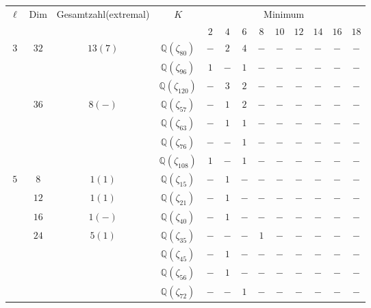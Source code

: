 \documentclass[12pt,a4paper,halfparskip,headsepline,bibtotocnumbered]{scrreprt}
\theoremstyle{nummermitklammern}
\theoremstyle{nonumberbreak}
\newcommand{\Q}{\mathbb{Q}}
\begin{document}
\begin{table}
	\centering
	\begin{tabular}{|c|c|c|c|c|c|c|c|c|c|c|c|c|}
		\hline		
		\multirow{2}{*}{$\ell$}	&\multirow{2}{*}{Dim}	&\multirow{2}{*}{Gesamtzahl(extremal)}	&\multirow{2}{*}{$K$}	&\multicolumn{9}{c|}{Minimum}\\ \cline{5-13}
								&						&							&					&$2$	&$4$	&$6$	&$8$	&$10$	&$12$	&$14$	&$16$	&$18$\\ \hline
		\multirow{7}{*}{$3$}	&\multirow{3}{*}{$32$}	&\multirow{3}{*}{$13(7)$}	&$\Q(\zeta_{80})$	&$-$	&$2$	&$4$	&$-$	&$-$	&$-$	&$-$	&$-$	&$-$\\ \cline{4-13}
								&						&							&$\Q(\zeta_{96})$	&$1$	&$-$	&$1$	&$-$	&$-$	&$-$	&$-$	&$-$	&$-$\\ \cline{4-13}
								&						&							&$\Q(\zeta_{120})$	&$-$	&$3$	&$2$	&$-$	&$-$	&$-$	&$-$	&$-$	&$-$\\ \cline{2-13}
								&\multirow{4}{*}{$36$}	&\multirow{4}{*}{$8(-)$}	&$\Q(\zeta_{57})$	&$-$	&$1$	&$2$	&$-$	&$-$	&$-$	&$-$	&$-$	&$-$\\ \cline{4-13}
								&						&							&$\Q(\zeta_{63})$	&$-$	&$1$	&$1$	&$-$	&$-$	&$-$	&$-$	&$-$	&$-$\\ \cline{4-13}
								&						&							&$\Q(\zeta_{76})$	&$-$	&$-$	&$1$	&$-$	&$-$	&$-$	&$-$	&$-$	&$-$\\ \cline{4-13}
								&						&							&$\Q(\zeta_{108})$	&$1$	&$-$	&$1$	&$-$	&$-$	&$-$	&$-$	&$-$	&$-$\\ \hline
		\multirow{12}{*}{$5$}	&$8$					&$1(1)$						&$\Q(\zeta_{15})$	&$-$	&$1$	&$-$	&$-$	&$-$	&$-$	&$-$	&$-$	&$-$\\ \cline{2-13}
								&$12$					&$1(1)$						&$\Q(\zeta_{21})$	&$-$	&$1$	&$-$	&$-$	&$-$	&$-$	&$-$	&$-$	&$-$\\ \cline{2-13}
								&$16$					&$1(-)$						&$\Q(\zeta_{40})$	&$-$	&$1$	&$-$	&$-$	&$-$	&$-$	&$-$	&$-$	&$-$\\ \cline{2-13}
								&\multirow{5}{*}{$24$}	&\multirow{5}{*}{$5(1)$}	&$\Q(\zeta_{35})$	&$-$	&$-$	&$-$	&$1$	&$-$	&$-$	&$-$	&$-$	&$-$\\ \cline{4-13}
								&						&							&$\Q(\zeta_{45})$	&$-$	&$1$	&$-$	&$-$	&$-$	&$-$	&$-$	&$-$	&$-$\\ \cline{4-13}
								&						&							&$\Q(\zeta_{56})$	&$-$	&$1$	&$-$	&$-$	&$-$	&$-$	&$-$	&$-$	&$-$\\ \cline{4-13}
								&						&							&$\Q(\zeta_{72})$	&$-$	&$-$	&$1$	&$-$	&$-$	&$-$	&$-$	&$-$	&$-$\\ \cline{4-13}

\end{tabular}
\end{table}
\end{document}
